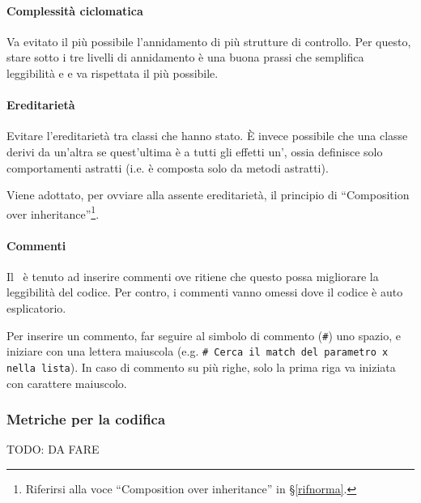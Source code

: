         \paragraph{Complessità ciclomatica}
		Va evitato il più possibile l'annidamento di più strutture di controllo. Per questo, stare sotto i tre livelli di annidamento è una buona
		prassi che semplifica leggibilità e  e va rispettata il più possibile.


		\paragraph{Ereditarietà}
		Evitare l'ereditarietà tra classi che hanno stato. È invece possibile che una classe derivi da un'altra se quest'ultima è a tutti gli
		effetti un', ossia definisce solo comportamenti astratti (i.e. è composta solo da metodi astratti).\par
		Viene adottato, per ovviare alla assente ereditarietà, il principio di ``Composition over inheritance''\footnote{Riferirsi alla voce %
		``Composition over inheritance'' in \S\ref{rifnorma}.}.


        \paragraph{Commenti}
		Il \Progr\ è tenuto ad inserire commenti ove ritiene che questo possa migliorare la leggibilità del codice. Per contro, i commenti vanno
		omessi dove il codice è auto esplicatorio.\par
		Per inserire un commento, far seguire al simbolo di commento (\texttt{\#}) uno spazio, e iniziare con una lettera maiuscola (e.g.
		\texttt{\#\ Cerca il match del parametro x nella lista}). In caso di commento su più righe, solo la prima riga va iniziata con carattere
		maiuscolo.



        \subsubsection{Metriche per la codifica} %
		TODO: DA FARE

